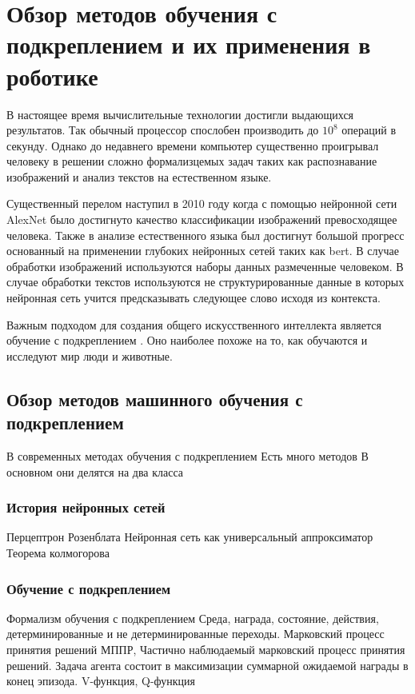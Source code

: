 \chapter{Обзор методов обучения с подкреплением и их применения в роботике}\label{ch:ch1}

В настоящее время вычислительные технологии достигли выдающихся результатов. Так обычный процессор спослобен производить до $10^8$ операций в секунду. Однако до недавнего времени компьютер существенно проигрывал человеку в решении сложно формализцемых задач таких как распознавание изображений и анализ текстов на естественном языке. 

Существенный перелом наступил в 2010 году когда с помощью нейронной сети AlexNet было достигнуто качество классификации изображений превосходящее человека. Также в анализе естественного языка был достигнут большой прогресс основанный на применении глубоких нейронных сетей таких как bert. В случае обработки изображений используются наборы данных размеченные человеком. В случае обработки текстов используются не структурированные данные в которых нейронная сеть учится предсказывать следующее слово исходя из контекста. 

Важным подходом для создания общего искусственного интеллекта является обучение с подкреплением \cite{reward_is_enough}. Оно наиболее похоже на то, как обучаются и исследуют мир люди и животные.  


\section{Обзор методов машинного обучения с подкреплением}\label{sec:ch1/sec1}

В современных методах обучения с подкреплением 
Есть много методов
В основном они делятся на два класса 

\subsection{История нейронных сетей}

Перцептрон Розенблата \cite{rosenblatt}
 \cite{Sirotko2, Lukina2, Encyclopedia2, Nasirova2}%
Нейронная сеть как универсальный аппроксиматор
Теорема колмогорова


\subsection{Обучение с подкреплением}

Формализм обучения с подкреплением
Среда, награда, состояние, действия, детерминированные и не детерминированные переходы. Марковский процесс принятия решений МППР, Частично наблюдаемый марковский процесс принятия решений. Задача агента состоит в максимизации суммарной ожидаемой награды в конец эпизода. V-функция, Q-функция

